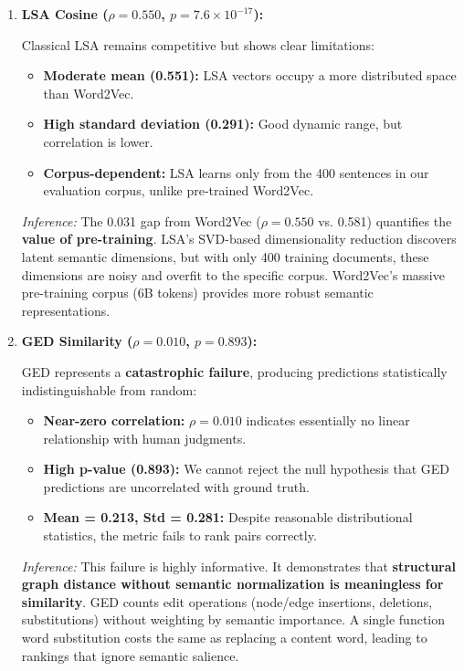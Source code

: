 \documentclass[11pt,a4paper]{article}
\begin{document}
\begin{enumerate}
    \item \textbf{LSA Cosine ($\rho = 0.550$, $p = 7.6 \times 10^{-17}$):} 
    
    Classical LSA remains competitive but shows clear limitations:
    \begin{itemize}
        \item \textbf{Moderate mean (0.551):} LSA vectors occupy a more distributed space than Word2Vec.
        \item \textbf{High standard deviation (0.291):} Good dynamic range, but correlation is lower.
        \item \textbf{Corpus-dependent:} LSA learns only from the 400 sentences in our evaluation corpus, unlike pre-trained Word2Vec.
    \end{itemize}
    
    \textit{Inference:} The 0.031 gap from Word2Vec ($\rho = 0.550$ vs. 0.581) quantifies the \textbf{value of pre-training}. LSA's SVD-based dimensionality reduction discovers latent semantic dimensions, but with only 400 training documents, these dimensions are noisy and overfit to the specific corpus. Word2Vec's massive pre-training corpus (6B tokens) provides more robust semantic representations.
    
    \item \textbf{GED Similarity ($\rho = 0.010$, $p = 0.893$):} 
    
    GED represents a \textbf{catastrophic failure}, producing predictions statistically indistinguishable from random:
    \begin{itemize}
        \item \textbf{Near-zero correlation:} $\rho = 0.010$ indicates essentially no linear relationship with human judgments.
        \item \textbf{High p-value (0.893):} We cannot reject the null hypothesis that GED predictions are uncorrelated with ground truth.
        \item \textbf{Mean = 0.213, Std = 0.281:} Despite reasonable distributional statistics, the metric fails to rank pairs correctly.
    \end{itemize}
    
    \textit{Inference:} This failure is highly informative. It demonstrates that \textbf{structural graph distance without semantic normalization is meaningless for similarity}. GED counts edit operations (node/edge insertions, deletions, substitutions) without weighting by semantic importance. A single function word substitution costs the same as replacing a content word, leading to rankings that ignore semantic salience.
\end{enumerate}
\end{document}
